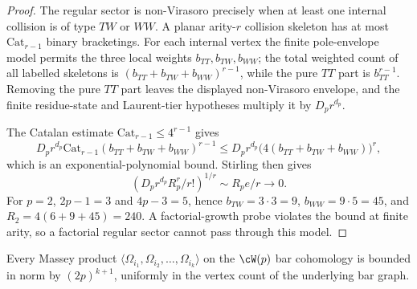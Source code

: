 \begin{proof}
The regular sector is non-Virasoro precisely when at least one internal
collision is of type $TW$ or $WW$. A planar arity-$r$ collision skeleton
has at most $\mathrm{Cat}_{r-1}$ binary bracketings. For each internal
vertex the finite pole-envelope model permits the three local weights
$b_{TT},b_{TW},b_{WW}$; the total weighted count of all labelled
skeletons is $(b_{TT}+b_{TW}+b_{WW})^{r-1}$, while the pure $TT$ part is
$b_{TT}^{r-1}$. Removing the pure $TT$ part leaves the displayed
non-Virasoro envelope, and the finite residue-state and Laurent-tier
hypotheses multiply it by $D_p r^{d_p}$.

The Catalan estimate $\mathrm{Cat}_{r-1}\le 4^{r-1}$ gives
\[
 D_p r^{d_p}\mathrm{Cat}_{r-1}
 (b_{TT}+b_{TW}+b_{WW})^{r-1}
 \le
 D_p r^{d_p}\bigl(4(b_{TT}+b_{TW}+b_{WW})\bigr)^r,
\]
which is an exponential-polynomial bound. Stirling then gives
\[
 \left(D_p r^{d_p}R_p^r/r!\right)^{1/r}
 \sim R_p e/r \longrightarrow 0.
\]
For $p=2$, $2p-1=3$ and $4p-3=5$, hence
$b_{TW}=3\cdot3=9$, $b_{WW}=9\cdot5=45$, and
$R_2=4(6+9+45)=240$. A factorial-growth probe violates the bound at
finite arity, so a factorial regular sector cannot pass through this
model.
\end{proof}

\begin{conjecture}
\label{lem:wp-zhu-bounded-masseys}
Every Massey product
$\langle \Omega_{i_1}, \Omega_{i_2}, \ldots, \Omega_{i_k} \rangle$
on the $\cW(p)$ bar cohomology is bounded in norm by
$(2p)^{k+1}$, uniformly in the vertex count of the underlying bar
graph.
\end{conjecture}

